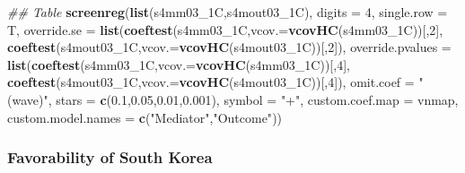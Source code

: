 \documentclass[
]{article}
\newenvironment{Shaded}{\begin{snugshade}}{\end{snugshade}}
\newcommand{\CommentTok}[1]{\textcolor[rgb]{0.56,0.35,0.01}{\textit{#1}}}
\newcommand{\DataTypeTok}[1]{\textcolor[rgb]{0.13,0.29,0.53}{#1}}
\newcommand{\DecValTok}[1]{\textcolor[rgb]{0.00,0.00,0.81}{#1}}
\newcommand{\FloatTok}[1]{\textcolor[rgb]{0.00,0.00,0.81}{#1}}
\newcommand{\KeywordTok}[1]{\textcolor[rgb]{0.13,0.29,0.53}{\textbf{#1}}}
\newcommand{\NormalTok}[1]{#1}
\newcommand{\StringTok}[1]{\textcolor[rgb]{0.31,0.60,0.02}{#1}}
\begin{document}
\begin{Shaded}
\begin{Highlighting}[]
\CommentTok{## Table}
\KeywordTok{screenreg}\NormalTok{(}\KeywordTok{list}\NormalTok{(s4mm03_1C,s4mout03_1C), }\DataTypeTok{digits =} \DecValTok{4}\NormalTok{, }\DataTypeTok{single.row =}\NormalTok{ T,}
          \DataTypeTok{override.se =} \KeywordTok{list}\NormalTok{(}\KeywordTok{coeftest}\NormalTok{(s4mm03_1C,}\DataTypeTok{vcov.=}\KeywordTok{vcovHC}\NormalTok{(s4mm03_1C))[,}\DecValTok{2}\NormalTok{],}
                             \KeywordTok{coeftest}\NormalTok{(s4mout03_1C,}\DataTypeTok{vcov.=}\KeywordTok{vcovHC}\NormalTok{(s4mout03_1C))[,}\DecValTok{2}\NormalTok{]),}
          \DataTypeTok{override.pvalues =} \KeywordTok{list}\NormalTok{(}\KeywordTok{coeftest}\NormalTok{(s4mm03_1C,}\DataTypeTok{vcov.=}\KeywordTok{vcovHC}\NormalTok{(s4mm03_1C))[,}\DecValTok{4}\NormalTok{],}
                                  \KeywordTok{coeftest}\NormalTok{(s4mout03_1C,}\DataTypeTok{vcov.=}\KeywordTok{vcovHC}\NormalTok{(s4mout03_1C))[,}\DecValTok{4}\NormalTok{]),}
          \DataTypeTok{omit.coef =} \StringTok{"(wave)"}\NormalTok{, }\DataTypeTok{stars =} \KeywordTok{c}\NormalTok{(}\FloatTok{0.1}\NormalTok{,}\FloatTok{0.05}\NormalTok{,}\FloatTok{0.01}\NormalTok{,}\FloatTok{0.001}\NormalTok{), }\DataTypeTok{symbol =} \StringTok{"+"}\NormalTok{,}
          \DataTypeTok{custom.coef.map =}\NormalTok{ vnmap, }
          \DataTypeTok{custom.model.names =} \KeywordTok{c}\NormalTok{(}\StringTok{"Mediator"}\NormalTok{,}\StringTok{"Outcome"}\NormalTok{))}
\end{Highlighting}
\end{Shaded}

\hypertarget{favorability-of-south-korea}{%
\subsubsection{Favorability of South
Korea}\label{favorability-of-south-korea}}
\end{document}
